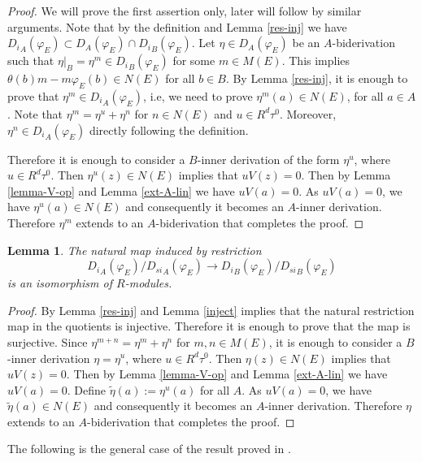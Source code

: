 \documentclass{amsart}
\newtheorem {lemma}[theorem] {\bf Lemma}
\numberwithin {equation}{section}
\begin{document}
\begin{proof} We will prove the first assertion only, later will follow by similar arguments. Note that by the definition and Lemma \ref{res-inj} we have ${D_{i}}_{A}(\varphi_{E})\subset D_{A}(\varphi_{E})\cap {D_{i}}_{B}(\varphi_{E})$. Let $\eta\in {D}_{A}(\varphi_{E}) $ be an $A$-biderivation such that $\eta|_{B}=\eta^{m}\in {D_{i}}_{B}(\varphi_{E})$ for some $m\in M(E)$. This implies $\theta(b)m-m\varphi_{E}(b)\in N(E)$ for all $b\in B$. By Lemma \ref{res-inj}, it is enough to prove that $\eta^{m}\in {D_{i}}_{A}(\varphi_{E})$, i.e, we need to prove $\eta^{m}(a)\in N(E)$, for all $a\in A$. Note that $\eta^m=\eta^{u}+\eta^{n}$ for $n\in N(E)$ and $u\in R^{d}\tau^{0}$. Moreover, $\eta^{n}\in {D_{i}}_{A}(\varphi_{E})$ directly following the definition. 

Therefore it is enough to consider a $B$-inner derivation of the form $\eta^{u}$, where $u\in R^{d}\tau^{0}$. Then $\eta^u(z)\in N(E)$ implies that $uV(z)=0$. Then by Lemma \ref{lemma-V-op} and Lemma \ref{ext-A-lin} we have $uV(a)=0$. As $uV(a)=0$, we have $\eta^u(a)\in N(E)$ and consequently it becomes an $A$-inner derivation. Therefore $\eta^m$ extends to an $A$-biderivation that completes the proof.  
\end{proof}
\begin{lemma}\label{iso-inn} The natural map induced by restriction $${D_{i}}_{A}(\varphi_{E})/{D_{si}}_{A}(\varphi_{E})\longrightarrow {D_{i}}_{B}(\varphi_{E})/{D_{si}}_{B}(\varphi_{E})$$ is an isomorphism of $R$-modules. 
\end{lemma}
\begin{proof}
By Lemma \ref{res-inj} and Lemma \ref{inject} implies that the natural restriction map in the quotients is injective. Therefore it is enough to prove that the map is surjective. Since $\eta^{m+n}=\eta^{m}+\eta^{n}$ for $m,n\in M(E)$, it is enough to consider a $B$-inner derivation $\eta=\eta^{u}$, where $u\in R^{d}\tau^{0}$. Then $\eta(z)\in N(E)$ implies that $uV(z)=0$. Then by Lemma \ref{lemma-V-op} and Lemma \ref{ext-A-lin} we have $uV(a)=0$. Define $\tilde{\eta}(a):=\eta^{u}(a)$ for all $A$. As $uV(a)=0$, we have $\tilde{\eta}(a)\in N(E)$ and consequently it becomes an $A$-inner derivation. Therefore $\eta$ extends to an $A$-biderivation that completes the proof. 
\end{proof}

The following is the general case of the result proved in \cite{BrPa}. 
\end{document}
